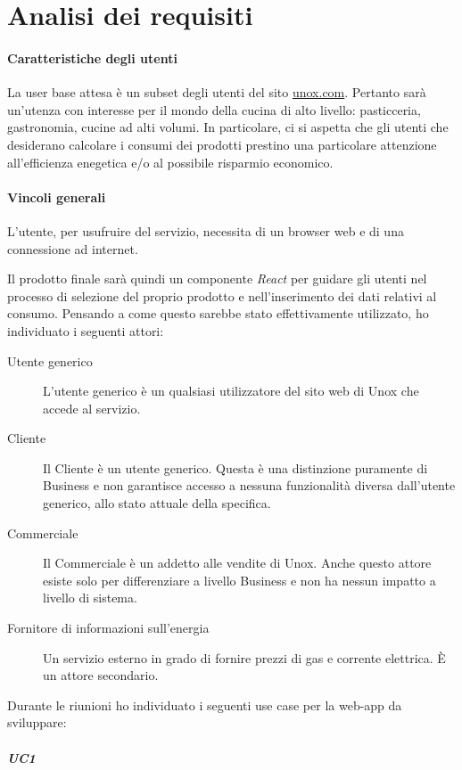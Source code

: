 \chapter{Analisi dei requisiti}
\label{chap:analisi_requisiti}

\subsubsection{Caratteristiche degli utenti}
La user base attesa è un subset degli utenti del sito \href{https://unox.com}{unox.com}. Pertanto sarà un'utenza con interesse per il mondo della cucina di alto livello: pasticceria, gastronomia, cucine ad alti volumi. In particolare, ci si aspetta che gli utenti che desiderano calcolare i consumi dei prodotti prestino una particolare attenzione all'efficienza enegetica e/o al possibile risparmio economico.

\subsubsection{Vincoli generali}
L'utente, per usufruire del servizio, necessita di un browser web e di una connessione ad internet.

Il prodotto finale sarà  quindi un componente \textit{React} per guidare gli utenti nel processo di selezione del proprio prodotto e nell'inserimento dei dati relativi al consumo. Pensando a come questo sarebbe stato effettivamente utilizzato, ho individuato i seguenti attori:
\begin{description}
	\item[Utente generico] L'utente generico è un qualsiasi utilizzatore del sito web di Unox che accede al servizio.
	\item[Cliente] Il Cliente è un utente generico. Questa è una distinzione puramente di Business e non garantisce accesso a nessuna funzionalità diversa dall'utente generico, allo stato attuale della specifica.
	\item[Commerciale]  Il Commerciale è un addetto alle vendite di Unox. Anche questo attore esiste solo per differenziare a livello Business e non ha nessun impatto a livello di sistema.
	\item[Fornitore di informazioni sull'energia] Un servizio esterno in grado di fornire prezzi di gas e corrente elettrica. È un attore secondario.
\end{description}
Durante le riunioni ho individuato i seguenti use case per la web-app da sviluppare:
\paragraph*{UC1}

